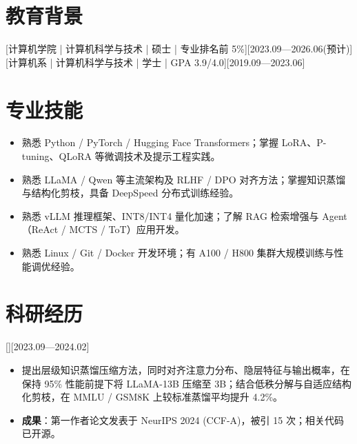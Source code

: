 \documentclass{resume-photo}
\begin{document}

\ResumeTitle


\section{教育背景}
[\textnormal{计算机学院 | 计算机科学与技术 | 硕士 | 专业排名前 5\%}][2023.09—2026.06(预计)]
[\textnormal{计算机系 | 计算机科学与技术 | 学士 | GPA 3.9/4.0}][2019.09—2023.06]

\section{专业技能}
\begin{itemize}
  \item 熟悉 Python / PyTorch / Hugging Face Transformers；掌握 LoRA、P-tuning、QLoRA 等微调技术及提示工程实践。
  \item 熟悉 LLaMA / Qwen 等主流架构及 RLHF / DPO 对齐方法；掌握知识蒸馏与结构化剪枝，具备 DeepSpeed 分布式训练经验。
  \item 熟悉 vLLM 推理框架、INT8/INT4 量化加速；了解 RAG 检索增强与 Agent（ReAct / MCTS / ToT）应用开发。
  \item 熟悉 Linux / Git / Docker 开发环境；有 A100 / H800 集群大规模训练与性能调优经验。
\end{itemize}

\section{科研经历}

[][2023.09—2024.02]
\begin{itemize}
  \item 提出层级知识蒸馏压缩方法，同时对齐注意力分布、隐层特征与输出概率，在保持 95\% 性能前提下将 LLaMA-13B 压缩至 3B；结合低秩分解与自适应结构化剪枝，在 MMLU / GSM8K 上较标准蒸馏平均提升 4.2\%。
  \item \textbf{成果}：第一作者论文发表于 NeurIPS 2024 (CCF-A)，被引 15 次；相关代码已开源。
\end{itemize}
\end{document}
